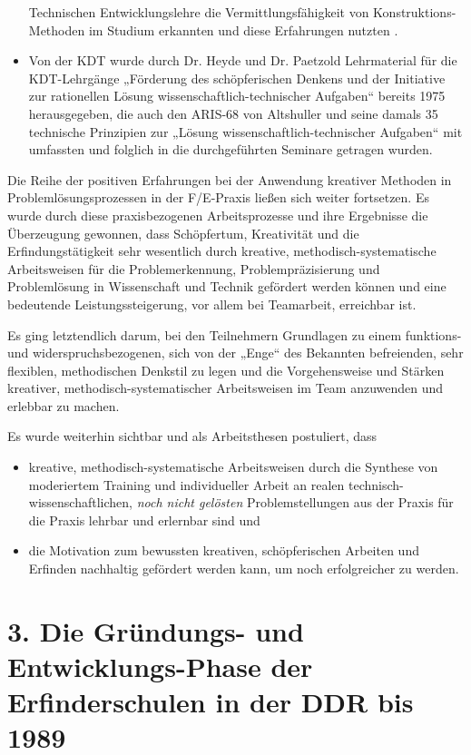 \documentclass[11pt,a4paper]{article}
\begin{document}
\begin{itemize}
  Technischen Entwicklungslehre die Vermittlungsfähigkeit von
  Konstruktions-Methoden im Studium erkannten und diese Erfahrungen nutzten
  \cite{4,5,6}.
\item Von der KDT wurde durch Dr. Heyde und Dr. Paetzold Lehrmaterial für die
  KDT-Lehrgänge „Förderung des schöpferischen Denkens und der Initiative zur
  rationellen Lösung wissenschaftlich-technischer Aufgaben“ bereits 1975
  \cite{20} herausgegeben, die auch den ARIS-68 von Altshuller und seine
  damals 35 technische Prinzipien zur „Lösung wissenschaftlich-technischer
  Aufgaben“ mit umfassten und folglich in die durchgeführten Seminare getragen
  wurden.
\end{itemize}
Die Reihe der positiven Erfahrungen bei der Anwendung kreativer Methoden in
Problem\-lösungs\-prozessen in der F/E-Praxis ließen sich weiter fortsetzen.
Es wurde durch diese praxisbezogenen Arbeitsprozesse und ihre Ergebnisse die
Überzeugung gewonnen, dass Schöpfertum, Kreativität und die
Erfindungstätigkeit sehr wesentlich durch kreative,
methodisch-systema\-ti\-sche Arbeitsweisen für die Problemerkennung,
Problempräzisierung und Problemlösung in Wissenschaft und Technik gefördert
werden können und eine bedeutende Leistungssteigerung, vor allem bei
Teamarbeit, erreichbar ist.

Es ging letztendlich darum, bei den Teilnehmern Grundlagen zu einem funktions-
und widerspruchsbezogenen, sich von der „Enge“ des Bekannten befreienden, sehr
flexiblen, methodischen Denkstil zu legen und die Vorgehensweise und Stärken
kreativer, methodisch-systematischer Arbeitsweisen im Team anzuwenden und
erlebbar zu machen.

Es wurde weiterhin sichtbar und als Arbeitsthesen postuliert, dass
\begin{itemize}
\item kreative, methodisch-systematische Arbeitsweisen durch die Synthese von
  moderiertem Training und individueller Arbeit an realen
  technisch-wissenschaftlichen, \emph{noch nicht gelösten} Problemstellungen
  aus der Praxis für die Praxis lehrbar und erlernbar sind und
\item die Motivation zum bewussten kreativen, schöpferischen Arbeiten und
  Erfinden nachhaltig gefördert werden kann, um noch erfolgreicher zu werden.
\end{itemize}

\section*{3. Die Gründungs- und Entwicklungs-Phase der Erfinderschulen in der
  DDR bis 1989} 
 
\end{document}
